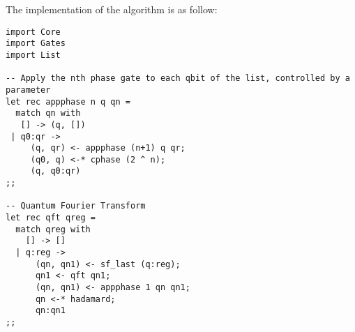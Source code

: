 The implementation of the algorithm is as follow:

\begin{verbatim}
import Core
import Gates
import List

-- Apply the nth phase gate to each qbit of the list, controlled by a parameter
let rec appphase n q qn =
  match qn with
   [] -> (q, [])
 | q0:qr ->
     (q, qr) <- appphase (n+1) q qr;
     (q0, q) <-* cphase (2 ^ n);
     (q, q0:qr)
;;

-- Quantum Fourier Transform
let rec qft qreg =
  match qreg with
    [] -> []
  | q:reg ->
      (qn, qn1) <- sf_last (q:reg);
      qn1 <- qft qn1;
      (qn, qn1) <- appphase 1 qn qn1;
      qn <-* hadamard;
      qn:qn1
;;
\end{verbatim}


